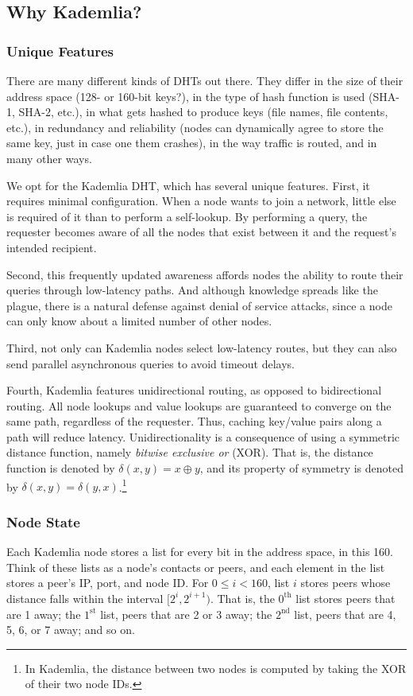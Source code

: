\documentclass[12pt,twocolumn]{article}
\begin{document}
\subsection{Why Kademlia?}

\subsubsection{Unique Features}
There are many different kinds of DHTs out there. They differ in the size of their address space (128- or 160-bit keys?), in the type of hash function is used (SHA-1, SHA-2, etc.), in what gets hashed to produce keys (file names, file contents, etc.), in redundancy and reliability (nodes can dynamically agree to store the same key, just in case one them crashes), in the way traffic is routed, and in many other ways.

We opt for the Kademlia DHT, which has several unique features.
First, it requires minimal configuration.
When a node wants to join a network, little else is required of it than to perform a self-lookup.
By performing a query, the requester becomes aware of all the nodes that exist between it and the request's intended recipient.

Second, this frequently updated awareness affords nodes the ability to route their queries through low-latency paths.
And although knowledge spreads like the plague, there is a natural defense against denial of service attacks, since a node can only know about a limited number of other nodes.

Third, not only can Kademlia nodes select low-latency routes, but they can also send parallel asynchronous queries to avoid timeout delays.

Fourth, Kademlia features unidirectional routing, as opposed to bidirectional routing.
All node lookups and value lookups are guaranteed to converge on the same path, regardless of the requester.
Thus, caching key/value pairs along a path will reduce latency.
Unidirectionality is a consequence of using a symmetric distance function, namely \emph{bitwise exclusive or} (XOR).
That is, the distance function is denoted by $\delta(x,y) = x \oplus y$, and its property of symmetry is denoted by $\delta(x,y) = \delta(y,x)$.\footnote{In Kademlia, the distance between two nodes is computed by taking the XOR of their two node IDs.}

\subsubsection{Node State}
Each Kademlia node stores a list for every bit in the address space, in this 160.
Think of these lists as a node's contacts or peers, and each element in the list stores a peer's IP, port, and node ID.
For $0 \leq i < 160$, list $i$ stores peers whose distance falls within the interval $[2^i, 2^{i+1})$.
That is, the $0^{\mathrm{th}}$ list stores peers that are 1 away; the $1^{\mathrm{st}}$ list, peers that are 2 or 3 away; the $2^{\mathrm{nd}}$ list, peers that are 4, 5, 6, or 7 away; and so on.
\end{document}
